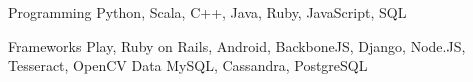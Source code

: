 

\begin{cvskills}

  \cvskill
    {Programming} %
    {Python, Scala, C++, Java, Ruby, JavaScript, SQL} %


  \cvskill
  {Frameworks} %
    {Play, Ruby on Rails, Android, BackboneJS, Django, Node.JS, Tesseract, OpenCV } %
  \cvskill
  {Data} %
    {MySQL, Cassandra, PostgreSQL} %
\end{cvskills}
